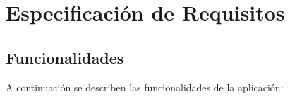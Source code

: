 %
%
%
%

\cleardoublepage
\chapter{Especificación de Requisitos}
\label{chap:requirements}

	\section{Funcionalidades}
		A continuación se describen las funcionalidades de la aplicación:
